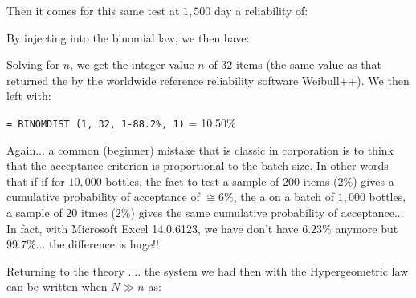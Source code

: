 	\begin{tcolorbox}[colframe=black,colback=white,sharp corners]
	
	Then it comes for this same test at $1,500$ day a reliability of:
	
	By injecting into the binomial law, we then have:
	
	Solving for $n$, we get the integer value $n$ of $32$ items (the same value as that returned the by the worldwide reference reliability software Weibull++). We then left with:
	\begin{center}
		\texttt{= BINOMDIST (1, 32, 1-88.2\%, 1)} = 10.50\%
	\end{center}
	\begin{tcolorbox}[title=Remark,colframe=black,arc=10pt]
	Again... a common (beginner) mistake that is classic in corporation is to think that the acceptance criterion is proportional to the batch size. In other words that if if for $10,000$ bottles, the fact to test a sample of $200$ items ($2\%$) gives a cumulative probability of acceptance of $\cong 6\%$, the a on a batch of $1,000$ bottles, a sample of $20$ itmes ($2\%$) gives the same cumulative probability of acceptance... In fact, with Microsoft Excel 14.0.6123, we have don't have $6.23\%$ anymore but $99.7\%$... the difference is huge!!
	\end{tcolorbox}	
	\end{tcolorbox}
	Returning to the theory .... the system we had then with the Hypergeometric law can be written when $N\gg n$ as:
	
